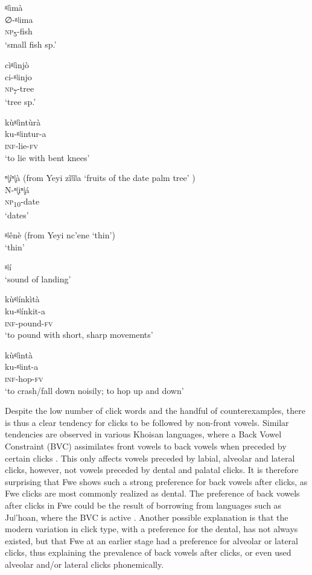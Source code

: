 \ea
\label{bkm:Ref98925692}
\glll ᵍǀìmà\\
∅-ᵍǀima\\
\textsc{np}\textsubscript{5}-fish\\
\glt ‘small fish sp.’
\z

\ea
\glll cìᵍǀìnjò\\
ci-ᵍǀinjo\\
\textsc{np}\textsubscript{7}-tree\\
\glt ‘tree sp.’
\z

\ea
\glll kùᵍǀìntùrà\\
ku-ᵍǀintur-a\\
\textsc{inf}-lie-\textsc{fv}\\
\glt ‘to lie with bent knees’
\z

\ea
\label{bkm:Ref488832709}
ⁿǀ̥íⁿǀ̥à (from Yeyi zĩǀĩǀa ‘fruits of the date palm tree’ \citep[28]{Seidel2008})\\
N-ⁿ{ǀ}̥iⁿ{ǀ}̥á \\
\textsc{np}\textsubscript{10}-date\\
\glt ‘dates’
\z

\ea
\label{bkm:Ref488832710}
 ᵍǀênè (from Yeyi nc’ene ‘thin’)\\
‘thin’
\z

\ea
\label{bkm:Ref448238192}
  ᵍǀí\\
  ‘sound of landing’
\z

\ea
\glll kùᵍǀínkìtà\\
ku-ᵍǀínkit-a\\
\textsc{inf}-pound-\textsc{fv}\\
\glt ‘to pound with short, sharp movements’
\z

\ea
\glll kùᵍǀìntà\\
ku-ᵍǀint-a\\
\textsc{inf}-hop-\textsc{fv}\\
\glt ‘to crash/fall down noisily; to hop up and down’
\z

Despite the low number of click words and the handful of counterexamples, there is thus a clear tendency for clicks to be followed by non-front vowels. Similar tendencies are observed in various Khoisan languages, where a Back Vowel Constraint (BVC) assimilates front vowels to back vowels when preceded by certain clicks \citep{Miller2011}. This only affects vowels preceded by labial, alveolar and lateral clicks, however, not vowels preceded by dental and palatal clicks. It is therefore surprising that Fwe shows such a strong preference for back vowels after clicks, as Fwe clicks are most commonly realized as dental. The preference of back vowels after clicks in Fwe could be the result of borrowing from languages such as Juǀ’hoan, where the BVC is active \citep{Miller2013}. Another possible explanation is that the modern variation in click type, with a preference for the dental, has not always existed, but that Fwe at an earlier stage had a preference for alveolar or lateral clicks, thus explaining the prevalence of back vowels after clicks, or even used alveolar and/or lateral clicks phonemically.


